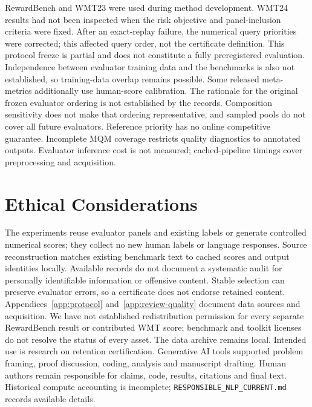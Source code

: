 \documentclass[11pt]{article}
\begin{document}
RewardBench and WMT23 were used during method development. WMT24 results had not been inspected when the risk objective and panel-inclusion criteria were fixed. After an exact-replay failure, the numerical query priorities were corrected; this affected query order, not the certificate definition. This protocol freeze is partial and does not constitute a fully preregistered evaluation. Independence between evaluator training data and the benchmarks is also not established, so training-data overlap remains possible. Some released meta-metrics additionally use human-score calibration. The rationale for the original frozen evaluator ordering is not established by the records. Composition sensitivity does not make that ordering representative, and sampled pools do not cover all future evaluators. Reference priority has no online competitive guarantee. Incomplete MQM coverage restricts quality diagnostics to annotated outputs. Evaluator inference cost is not measured; cached-pipeline timings cover preprocessing and acquisition.

\section*{Ethical Considerations}
The experiments reuse evaluator panels and existing labels or generate controlled numerical scores; they collect no new human labels or language responses. Source reconstruction matches existing benchmark text to cached scores and output identities locally. Available records do not document a systematic audit for personally identifiable information or offensive content. Stable selection can preserve evaluator errors, so a certificate does not endorse retained content. Appendices~\ref{app:protocol} and~\ref{app:review-quality} document data sources and acquisition. We have not established redistribution permission for every separate RewardBench result or contributed WMT score; benchmark and toolkit licenses do not resolve the status of every asset. The data archive remains local. Intended use is research on retention certification. Generative AI tools supported problem framing, proof discussion, coding, analysis and manuscript drafting. Human authors remain responsible for claims, code, results, citations and final text. Historical compute accounting is incomplete; \nolinkurl{RESPONSIBLE_NLP_CURRENT.md} records available details.


\clearpage
\appendix

\end{document}
